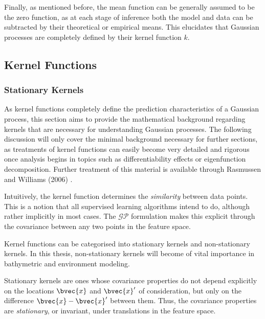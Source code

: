 			Finally, as mentioned before, the mean function can be generally assumed to be the zero function, as at each stage of inference both the model and data can be subtracted by their theoretical or empirical means. This elucidates that Gaussian processes are completely defined by their kernel function $k$. 
			
			\FloatBarrier
			
		\subsection{Kernel Functions}
		\label{Background:GaussianProcesses:KernelFunctions}
		
			\subsubsection{Stationary Kernels}
			
				As kernel functions completely define the prediction characteristics of a Gaussian process, this section aims to provide the mathematical background regarding kernels that are necessary for understanding Gaussian processes. The following discussion will only cover the minimal background necessary for further sections, as treatments of kernel functions can easily become very detailed and rigorous once analysis begins in topics such as differentiability effects or eigenfunction decomposition. Further treatment of this material is available through Rasmussen and Williams (2006) \citep{GaussianProcessForMachineLearning}. 
				
				Intuitively, the kernel function determines the \textit{similarity} between data points. This is a notion that all supervised learning algorithms intend to do, although rather implicitly in most cases. The $\mathcal{GP}$ formulation makes this explicit through the covariance between any two points in the feature space.
				
				Kernel functions can be categorised into stationary kernels and non-stationary kernels. In this thesis, non-stationary kernels will become of vital importance in bathymetric and environment modeling. 
				
				Stationary kernels are ones whose covariance properties do not depend explicitly on the locations $\bvec{x}$ and $\bvec{x}'$ of consideration, but only on the difference $\bvec{x} - \bvec{x}'$ between them. Thus, the covariance properties are \textit{stationary}, or invariant, under translations in the feature space.
				
